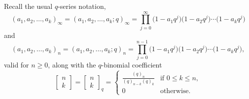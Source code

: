 Recall the usual $q$-series notation,
\begin{equation*}
	(a_1,a_2,\dots ,a_k)_{\infty} = (a_1,a_2,\dots ,a_k;q)_{\infty} = \prod_{j=0}^{\infty} \bigl(1-a_1q^j\bigr)\bigl(1-a_2q^j\bigr) \cdots \bigl(1-a_kq^j\bigr)
\end{equation*}
and
\begin{equation*}
	(a_1,a_2,\dots ,a_k)_n = (a_1,a_2,\dots ,a_k;q)_n = \prod_{j=0}^{n-1} \bigl(1-a_1q^j\bigr)\bigl(1-a_2q^j\bigr) \cdots \bigl(1-a_kq^j\bigr),
\end{equation*}
valid for $n \geq 0$, along with the $q$-binomial coefficient
\begin{equation} \label{eqn:qbinom}
	\begin{bmatrix} n \\ k \end{bmatrix} = \begin{bmatrix} n \\ k \end{bmatrix}_q =
	\begin{cases}
		\displaystyle\frac{(q)_n}{(q)_{n-k}(q)_k} & \text{if $0 \leq k \leq n$}, \\
		0 & \text{otherwise}.
	\end{cases}
\end{equation}

